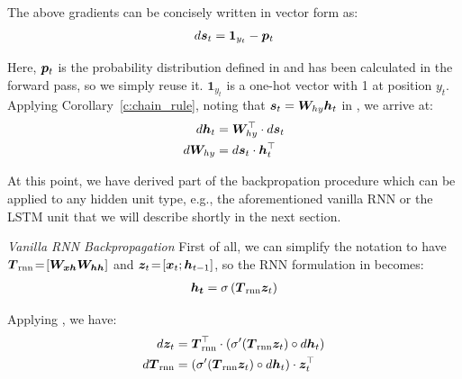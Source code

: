 The above gradients can be concisely written in vector form as:
\begin{align}
d\bm{s}_{t} = \bm{1}_{y_t} - \bm{p}_{t}
\end{align}

Here, $\bm{p}_{t}$ is the probability distribution defined in  and has
been calculated in the forward pass,
so we simply reuse it. $\bm{1}_{y_t}$ is a one-hot vector with 1 at position
$y_t$. 
Applying Corollary~\ref{c:chain_rule}, noting that $\bm{s}_{t} = \bm{W}_{hy}\bm{h}_{t}$ in
, we
arrive at:
\begin{align}
d\bm{h}_{t} &=  \bm{W}_{hy}^\top \cdot d\bm{s}_{t} \label{e:grad_ht}\\
d\bm{W}_{hy} &=  d\bm{s}_{t} \cdot \bm{h}_{t}^\top \label{e:grad_Why}
\end{align}

At this point, we have derived part of the backpropation procedure which can be
applied to any hidden unit type, e.g., the aforementioned vanilla RNN or the
LSTM unit that we will describe shortly in the next section. 

{\it Vanilla RNN Backpropagation} \indent 
First of all, we can simplify the notation to have $\mbox{\boldmath{$T$}}_{\text{rnn}}\!=\![\mbox{\boldmath{$W_{xh}$}}
\mbox{\boldmath{$W_{hh}$}}]$ and $\bm{z}_{t}\!=\![\bm{x}_{t};
\bm{h}_{t-1}]$, so the RNN formulation in  %
becomes:
\begin{align}
\mbox{\boldmath{$h_t$}} = \sigma \left(\mbox{\boldmath{$T$}}_{\text{rnn}} \bm{z}_{t}\right) \label{e:rnn_simplified}
\end{align}

Applying , we have:
\begin{align}
d\bm{z}_{t} &=  \mbox{\boldmath{$T$}}_{\text{rnn}}^\top \cdot
\left(\sigma'(\mbox{\boldmath{$T$}}_{\text{rnn}} \bm{z}_{t}) \circ d\bm{h}_{t}\right) \label{e:grad_zt} \\
d\mbox{\boldmath{$T$}}_{\text{rnn}} &=  \left(\sigma'(\mbox{\boldmath{$T$}}_{\text{rnn}} \bm{z}_{t}) \circ d\bm{h}_{t}\right) \cdot \bm{z}_{t}^\top \label{e:grad_rnn}
\end{align}

